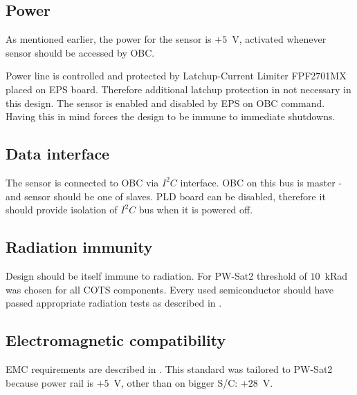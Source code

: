 \subsection{Power}
	As mentioned earlier, the power for the sensor is $+5$~V, activated whenever sensor should be accessed by OBC. 
	
	Power line is controlled and protected by Latchup-Current Limiter FPF2701MX placed on EPS board. Therefore additional latchup protection in not necessary in this design. The sensor is enabled and disabled by EPS on OBC command. Having this in mind forces the design to be immune to immediate shutdowns. 
	
\subsection{Data interface}
	The sensor is connected to OBC via $I^2C$ interface. OBC on this bus is master - and sensor should be one of slaves. PLD board can be disabled, therefore it should provide isolation of $I^2C$ bus when it is powered off.
	
\subsection{Radiation immunity}
	Design should be itself immune to radiation. For PW-Sat2 threshold of $10$~kRad was chosen for all COTS components. Every used semiconductor should have passed appropriate radiation tests as described in \cite{ESCIES_TID_test_method}.

\subsection{Electromagnetic compatibility}
	EMC requirements are described in \cite{ECSS_E_ST_20_07C}. This standard was tailored to PW-Sat2 because power rail is $+5$~V, other than on bigger S/C: $+28$~V.
	

